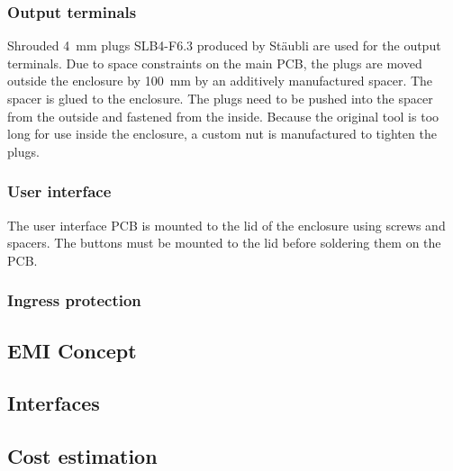 \subsubsection{Output terminals}
Shrouded \qty{4}{\milli\meter} plugs SLB4-F6.3 produced by Stäubli are used for the output terminals. Due to space constraints on the main PCB, the plugs are moved outside the enclosure by \qty{100}{\milli\meter}  by an additively manufactured spacer. The spacer is glued to the enclosure.  The plugs need to be pushed into the spacer from the outside and fastened from the inside. Because the original tool  is too long for use inside the enclosure, a custom nut is manufactured to tighten the plugs. 

\subsubsection{User interface}
The user interface PCB is mounted to the lid of the enclosure using screws and spacers. The buttons must be mounted to the lid before soldering them on the PCB. 

\subsubsection{Ingress protection}

\FloatBarrier
\subsection{EMI Concept}

\FloatBarrier
\subsection{Interfaces}

\FloatBarrier
\subsection{Cost estimation}




